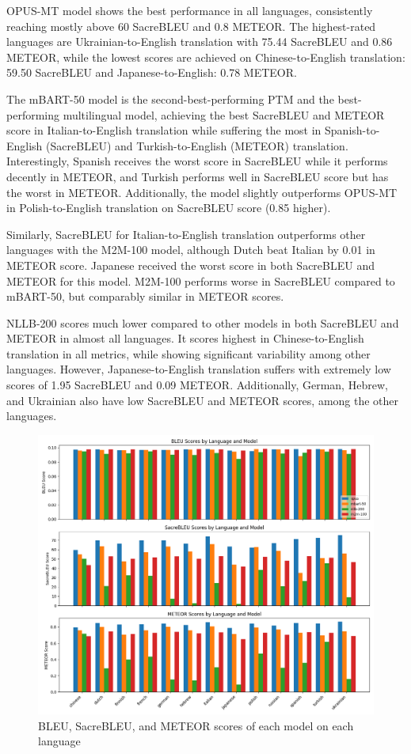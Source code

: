 \documentclass[a4paper, 11pt]{article}
\begin{document}
OPUS-MT model shows the best performance in all languages, consistently reaching mostly above 60 SacreBLEU and 0.8 METEOR. The highest-rated languages are Ukrainian-to-English translation with 75.44 SacreBLEU and 0.86 METEOR, while the lowest scores are achieved on Chinese-to-English translation: 59.50 SacreBLEU and Japanese-to-English: 0.78 METEOR.

The mBART-50 model is the second-best-performing PTM and the best-performing multilingual model, achieving the best SacreBLEU and METEOR score in Italian-to-English translation while suffering the most in Spanish-to-English (SacreBLEU) and Turkish-to-English (METEOR) translation. Interestingly, Spanish receives the worst score in SacreBLEU while it performs decently in METEOR, and Turkish performs well in SacreBLEU score but has the worst in METEOR. Additionally, the model slightly outperforms OPUS-MT in Polish-to-English translation on SacreBLEU score (0.85 higher).

Similarly, SacreBLEU for Italian-to-English translation outperforms other languages with the M2M-100 model, although Dutch beat Italian by 0.01 in METEOR score. Japanese received the worst score in both SacreBLEU and METEOR for this model. M2M-100 performs worse in SacreBLEU compared to mBART-50, but comparably similar in METEOR scores.

NLLB-200 scores much lower compared to other models in both SacreBLEU and METEOR in almost all languages. It scores highest in Chinese-to-English translation in all metrics, while showing significant variability among other languages. However, Japanese-to-English translation suffers with extremely low scores of 1.95 SacreBLEU and 0.09 METEOR. Additionally, German, Hebrew, and Ukrainian also have low SacreBLEU and METEOR scores, among the other languages.

\begin{figure}[htbp]
    \centering
    \includegraphics[width=1\linewidth]{figures/metrics_bar.png}
    \caption{BLEU, SacreBLEU, and METEOR scores of each model on each language}
    \label{fig:result_visual}
\end{figure}
\end{document}
